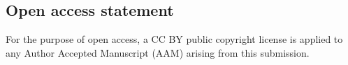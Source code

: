 \documentclass[11pt,a4paper]{article}
\theoremstyle{definition}
\theoremstyle{remark}
\begin{document}
\subsection*{Open access statement}

For the purpose of open access, a CC BY public copyright license is
applied to any Author Accepted Manuscript (AAM) arising from this
submission.

\printbibliography
\end{document}
